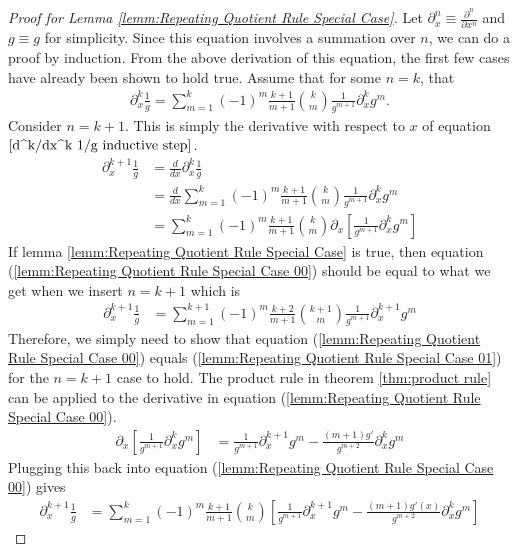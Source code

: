 \begin{proof}[Proof for Lemma \ref{lemm:Repeating Quotient Rule Special Case}]
Let $\partial_{x}^{n} \equiv \frac{\partial^{n}}{\partial x^{n}}$ and $g \equiv g$ for simplicity. Since this equation involves a summation over $n$, we can do a proof by induction. From the above derivation of this equation, the first few cases have already been shown to hold true. Assume that for some $n=k$, that 
\begin{align}
\partial_x^{k}\frac{1}{g} = \sum_{m=1}^{k}(-1)^m\frac{k+1}{m+1}\binom{k}{m}\frac{1}{g^{m+1}}\partial_x^kg^m \label{d^k/dx^k 1/g inductive step}.
\end{align} 
Consider $n=k+1$. This is simply the derivative with respect to $x$ of equation $\ref{d^k/dx^k 1/g inductive step}$.
\begin{align}
\partial_x^{k+1}\frac{1}{g} &= \frac{d}{dx}\partial_x^{k}\frac{1}{g} \\
&= \frac{d}{dx}\sum_{m=1}^{k}(-1)^m\frac{k+1}{m+1}\binom{k}{m}\frac{1}{g^{m+1}}\partial_x^kg^m \\
&= \sum_{m=1}^{k}(-1)^m\frac{k+1}{m+1}\binom{k}{m}\partial_x\left[\frac{1}{g^{m+1}}\partial_x^kg^m\right] \label{lemm:Repeating Quotient Rule Special Case 00}
\end{align}
If lemma \ref{lemm:Repeating Quotient Rule Special Case} is true, then equation (\ref{lemm:Repeating Quotient Rule Special Case 00}) should be equal to what we get when we insert $n=k+1$ which is
\begin{align}
\partial_x^{k+1}\frac{1}{g} &= \sum_{m=1}^{k+1}(-1)^m\frac{k+2}{m+1}\binom{k+1}{m}\frac{1}{g^{m+1}}\partial_x^{k+1}g^m \label{lemm:Repeating Quotient Rule Special Case 01}
\end{align}	
Therefore, we simply need to show that equation (\ref{lemm:Repeating Quotient Rule Special Case 00}) equals (\ref{lemm:Repeating Quotient Rule Special Case 01}) for the $n=k+1$ case to hold. The product rule in theorem \ref{thm:product rule} can be applied to the derivative in equation (\ref{lemm:Repeating Quotient Rule Special Case 00}). 
\begin{align}
\partial_x\left[\frac{1}{g^{m+1}}\partial_x^kg^m\right] &= \frac{1}{g^{m+1}}\partial_x^{k+1}g^m - \frac{(m+1)g'}{g^{m+2}}\partial_x^kg^m  \label{lemm:Repeating Quotient Rule Special Case 02}
\end{align}
Plugging this back into equation (\ref{lemm:Repeating Quotient Rule Special Case 00}) gives
\begin{align}
\partial_x^{k+1}\frac{1}{g} &= \sum_{m=1}^{k}(-1)^m\frac{k+1}{m+1}\binom{k}{m}\left[\frac{1}{g^{m+1}}\partial_x^{k+1}g^m - \frac{(m+1)g'(x)}{g^{m+2}}\partial_x^kg^m\right] \label{lemm:Repeating Quotient Rule Special Case 03}

\end{align}
\end{proof}
